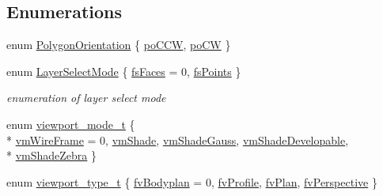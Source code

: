 \subsection*{Enumerations}
\begin{DoxyCompactItemize}
\item 
enum \hyperlink{namespaceShipCAD_a22a4489ec7a6505c3c30fa7562175ca4}{Polygon\+Orientation} \{ \hyperlink{namespaceShipCAD_a22a4489ec7a6505c3c30fa7562175ca4a01f1428a8463fbd20d80a779e70b39cd}{po\+C\+CW}, 
\hyperlink{namespaceShipCAD_a22a4489ec7a6505c3c30fa7562175ca4a785617c870ff5f0a2321ca2f6542aa7b}{po\+CW}
 \}
\item 
enum \hyperlink{namespaceShipCAD_a33e1c54e3609477478431b6a4c106804}{Layer\+Select\+Mode} \{ \hyperlink{namespaceShipCAD_a33e1c54e3609477478431b6a4c106804ade3fc9da994d6e6ab125978921665966}{fs\+Faces} = 0, 
\hyperlink{namespaceShipCAD_a33e1c54e3609477478431b6a4c106804a542ad0cef590007de75623cc41a83551}{fs\+Points}
 \}\begin{DoxyCompactList}\small\item\em enumeration of layer select mode \end{DoxyCompactList}
\item 
enum \hyperlink{namespaceShipCAD_a67437198ee14f74e6c5277d761894863}{viewport\+\_\+mode\+\_\+t} \{ \\*
\hyperlink{namespaceShipCAD_a67437198ee14f74e6c5277d761894863a109cd328af19be260371a7e5333043f8}{vm\+Wire\+Frame} = 0, 
\hyperlink{namespaceShipCAD_a67437198ee14f74e6c5277d761894863ab1258f959e2d114750dffb3f9c2e2c0c}{vm\+Shade}, 
\hyperlink{namespaceShipCAD_a67437198ee14f74e6c5277d761894863aaf20984128d2e9697958fa8c329a801a}{vm\+Shade\+Gauss}, 
\hyperlink{namespaceShipCAD_a67437198ee14f74e6c5277d761894863a85babb2fea8446064bbbf526b10bf36b}{vm\+Shade\+Developable}, 
\\*
\hyperlink{namespaceShipCAD_a67437198ee14f74e6c5277d761894863a70fcfa9199faab53e43f138ed64ad12f}{vm\+Shade\+Zebra}
 \}
\item 
enum \hyperlink{namespaceShipCAD_aeeeb05810f2e31ef89fd4ac6b6ba9c0a}{viewport\+\_\+type\+\_\+t} \{ \hyperlink{namespaceShipCAD_aeeeb05810f2e31ef89fd4ac6b6ba9c0aa1bc519e3e41c233dd8e94c40af1fd36d}{fv\+Bodyplan} = 0, 
\hyperlink{namespaceShipCAD_aeeeb05810f2e31ef89fd4ac6b6ba9c0aa05a0a083efb18429cbb855b2dcbf5e18}{fv\+Profile}, 
\hyperlink{namespaceShipCAD_aeeeb05810f2e31ef89fd4ac6b6ba9c0aab67fb04b0624572e1567bff4caefde27}{fv\+Plan}, 
\hyperlink{namespaceShipCAD_aeeeb05810f2e31ef89fd4ac6b6ba9c0aaccdacbf26c0ffe78ae55326537a28dc1}{fv\+Perspective}
 \}

\end{DoxyCompactItemize}
